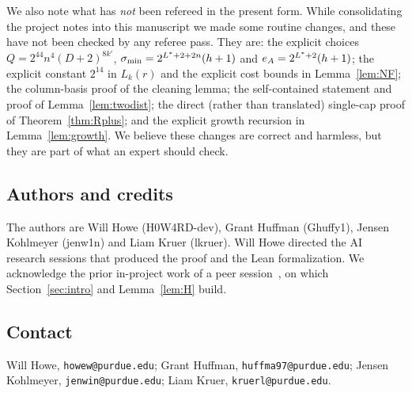 We also note what has \emph{not} been refereed in the present form. While consolidating the project notes into this
manuscript we made some routine changes, and these have not been checked by any referee pass. They are: the
explicit choices $Q=2^{44}n^4(D+2)^{8k'}$, $\sigma_{\min}=2^{L^{\ast}+2+2n}(h+1)$ and $e_A=2^{L^{\ast}+2}(h+1)$; the explicit constant
$2^{14}$ in $L_k(r)$ and the explicit cost bounds in Lemma~\ref{lem:NF}; the column-basis proof of the cleaning lemma; the
self-contained statement and proof of Lemma~\ref{lem:twodist}; the direct (rather than translated) single-cap proof of
Theorem~\ref{thm:Rplus}; and the explicit growth recursion in Lemma~\ref{lem:growth}. We believe these changes are correct
and harmless, but they are part of what an expert should check.

\subsection*{Authors and credits}
The authors are Will Howe (H0W4RD-dev), Grant Huffman (Ghuffy1), Jensen Kohlmeyer (jenw1n) and Liam Kruer
(lkruer). Will Howe directed the AI research sessions that produced the proof and the Lean formalization. We
acknowledge the prior in-project work of a peer session~\cite{Peer}, on which Section~\ref{sec:intro} and
Lemma~\ref{lem:H} build.

\subsection*{Contact}
Will Howe, \texttt{howew@purdue.edu}; Grant Huffman, \texttt{huffma97@purdue.edu}; Jensen Kohlmeyer,
\texttt{jenwin@purdue.edu}; Liam Kruer, \texttt{kruerl@purdue.edu}.
